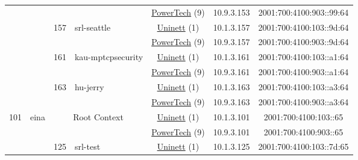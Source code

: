 \begin{small}
\begin{center}
\begin{longtable}{|c|c|c|c|c|c|c|c|}
  &  &  &  & \multicolumn{2}{|c|}{\tiny{\href{http://www.powertech.no}{PowerTech} (9)}} & \tiny{10.9.3.153} & \tiny{2001:700:4100:903::99:64} \\* \cline{3-3}\cline{4-4}\cline{5-5}\cline{6-6}\cline{7-7}\cline{8-8}
  &  & \multirow{2}{*}{\tiny{157}} & \multicolumn{1}{|l|}{\multirow{2}{*}{\tiny{srl-seattle}}} & \multicolumn{2}{|c|}{\tiny{\href{https://www.uninett.no}{Uninett} (1)}} & \tiny{10.1.3.157} & \tiny{2001:700:4100:103::9d:64} \\* \cline{5-5}\cline{6-6}\cline{7-7}\cline{8-8}
  &  &  &  & \multicolumn{2}{|c|}{\tiny{\href{http://www.powertech.no}{PowerTech} (9)}} & \tiny{10.9.3.157} & \tiny{2001:700:4100:903::9d:64} \\* \cline{3-3}\cline{4-4}\cline{5-5}\cline{6-6}\cline{7-7}\cline{8-8}
  &  & \multirow{2}{*}{\tiny{161}} & \multicolumn{1}{|l|}{\multirow{2}{*}{\tiny{kau-mptcpsecurity}}} & \multicolumn{2}{|c|}{\tiny{\href{https://www.uninett.no}{Uninett} (1)}} & \tiny{10.1.3.161} & \tiny{2001:700:4100:103::a1:64} \\* \cline{5-5}\cline{6-6}\cline{7-7}\cline{8-8}
  &  &  &  & \multicolumn{2}{|c|}{\tiny{\href{http://www.powertech.no}{PowerTech} (9)}} & \tiny{10.9.3.161} & \tiny{2001:700:4100:903::a1:64} \\* \cline{3-3}\cline{4-4}\cline{5-5}\cline{6-6}\cline{7-7}\cline{8-8}
  &  & \multirow{2}{*}{\tiny{163}} & \multicolumn{1}{|l|}{\multirow{2}{*}{\tiny{hu-jerry}}} & \multicolumn{2}{|c|}{\tiny{\href{https://www.uninett.no}{Uninett} (1)}} & \tiny{10.1.3.163} & \tiny{2001:700:4100:103::a3:64} \\* \cline{5-5}\cline{6-6}\cline{7-7}\cline{8-8}
  &  &  &  & \multicolumn{2}{|c|}{\tiny{\href{http://www.powertech.no}{PowerTech} (9)}} & \tiny{10.9.3.163} & \tiny{2001:700:4100:903::a3:64} \\ \hline
 \multirow{18}{*}{\tiny{101}} & \multicolumn{1}{|l|}{\multirow{18}{*}{\tiny{eina}}} & \multicolumn{2}{|c|}{\multirow{2}{*}{\tiny{Root Context}}} & \multicolumn{2}{|c|}{\tiny{\href{https://www.uninett.no}{Uninett} (1)}} & \tiny{10.1.3.101} & \tiny{2001:700:4100:103::65} \\* \cline{5-5}\cline{6-6}\cline{7-7}\cline{8-8}
  &  & \multicolumn{2}{|c|}{} & \multicolumn{2}{|c|}{\tiny{\href{http://www.powertech.no}{PowerTech} (9)}} & \tiny{10.9.3.101} & \tiny{2001:700:4100:903::65} \\* \cline{3-3}\cline{4-4}\cline{5-5}\cline{6-6}\cline{7-7}\cline{8-8}
  &  & \multirow{2}{*}{\tiny{125}} & \multicolumn{1}{|l|}{\multirow{2}{*}{\tiny{srl-test}}} & \multicolumn{2}{|c|}{\tiny{\href{https://www.uninett.no}{Uninett} (1)}} & \tiny{10.1.3.125} & \tiny{2001:700:4100:103::7d:65} \\* \cline{5-5}\cline{6-6}\cline{7-7}\cline{8-8}

\end{longtable}
\end{center}
\end{small}
